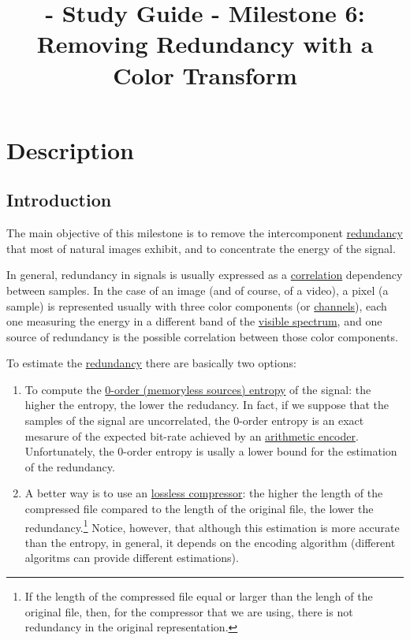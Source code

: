 
\title{\SM{} - Study Guide - Milestone 6: Removing Redundancy with a Color Transform}

\maketitle

\section{Description}

\subsection{Introduction}
The main objective of this milestone is to remove the intercomponent
\href{https://en.wikipedia.org/wiki/Data_redundancy}{redundancy} that
most of natural images exhibit, and to concentrate the energy of the
signal. 

In general, redundancy in signals is
usually expressed as a
\href{https://en.wikipedia.org/wiki/Correlation_and_dependence}{correlation}
dependency between samples. In the case of an image (and of course, of
a video), a pixel (a sample) is represented usually with three color
components (or
\href{https://en.wikipedia.org/wiki/Color_image}{channels}), each one
measuring the energy in a different band of the
\href{https://en.wikipedia.org/wiki/Visible_spectrum}{visible
  spectrum}, and one source of redundancy is the possible correlation
between those color components.

To estimate the
\href{https://en.wikipedia.org/wiki/Redundancy_(information_theory)}{redundancy}
there are basically two options:
\begin{enumerate}
\item To compute the
  \href{https://en.wikipedia.org/wiki/Entropy_(information_theory)}{0-order
    (memoryless sources) entropy} of the signal: the higher the
  entropy, the lower the redudancy. In fact, if we suppose that the
  samples of the signal are uncorrelated, the 0-order entropy is an
  exact mesarure of the expected bit-rate achieved by an
  \href{https://en.wikipedia.org/wiki/Arithmetic_coding}{arithmetic
    encoder}.  Unfortunately, the 0-order entropy is usally a lower
  bound for the estimation of the redundancy.
\item A better way is to use an
  \href{https://en.wikipedia.org/wiki/Data_compression}{lossless
    compressor}: the higher the length of the compressed file compared
  to the length of the original file, the lower the
  redundancy.\footnote{If the length of the compressed file equal or
  larger than the lengh of the original file, then, for the compressor
  that we are using, there is not redundancy in the original
  representation.} Notice, however, that although this estimation is
  more accurate than the entropy, in general, it depends on the
  encoding algorithm (different algoritms can provide different
  estimations).
\end{enumerate}

